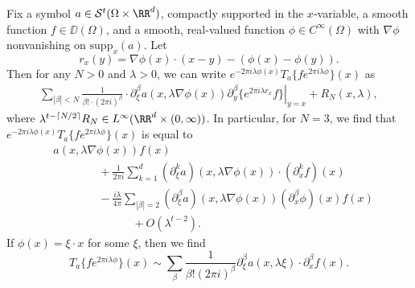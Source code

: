 \begin{theorem}
    Fix a symbol $a \in \mathcal{S}^t(\Omega \times \RR^d)$, compactly supported in the $x$-variable, a smooth function $f \in \DD(\Omega)$, and a smooth, real-valued function $\phi \in C^\infty(\Omega)$ with $\nabla \phi$ nonvanishing on $\text{supp}_x(a)$. Let
    \[ r_x(y) = \nabla \phi(x) \cdot (x - y) - (\phi(x) - \phi(y)). \]
    Then for any $N > 0$ and $\lambda > 0$, we can write $e^{-2 \pi i \lambda \phi(x)} T_a \{ f e^{2 \pi i \lambda \phi} \}(x)$ as
    \begin{align*}
        \sum_{|\beta| < N} \frac{1}{\beta! \cdot (2 \pi i)^{\beta}} \cdot \partial_\xi^\beta a(x,\lambda \nabla \phi(x)) \left. \partial^\beta_y \{ e^{2 \pi i \lambda r_x} f \} \right|_{y = x} + R_N(x,\lambda),
    \end{align*}
    where $\lambda^{t - \lceil N/2 \rceil} R_N \in L^\infty(\RR^d \times (0,\infty))$. In particular, for $N = 3$, we find that $e^{-2 \pi i \lambda \phi(x)} T_a \{ f e^{2 \pi i \lambda \phi} \}(x)$ is equal to
    \begin{align*}
        & a(x, \lambda \nabla \phi(x)) f(x)\\
            &\quad\quad\quad\quad + \frac{1}{2\pi i} \sum_{k = 1}^d (\partial^k_\xi a)(x,\lambda \nabla \phi(x)) \cdot (\partial^k_x f)(x)\\
            &\quad\quad\quad\quad - \frac{i \lambda}{4 \pi} \sum_{|\beta| = 2} (\partial^\beta_\xi a)(x,\lambda \nabla \phi(x)) (\partial^\beta_x \phi)(x) f(x)\\
            &\quad\quad\quad\quad\quad\quad\quad + O(\lambda^{t - 2}).
    \end{align*}
    If $\phi(x) = \xi \cdot x$ for some $\xi$, then we find
    \[ T_a \{ f e^{2 \pi i \lambda \phi} \}(x) \sim \sum_{\beta} \frac{1}{\beta! (2 \pi i )^\beta} \partial_\xi^\beta a(x,\lambda \xi) \cdot \partial^\beta_x f(x). \]
\end{theorem}
